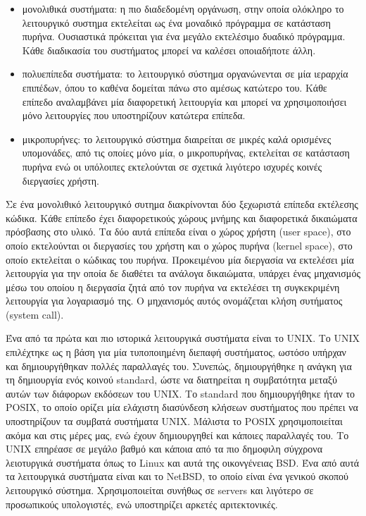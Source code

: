 \begin{itemize}
	\item μονολιθικά συστήματα: η πιο διαδεδομένη οργάνωση, στην οποία
		ολόκληρο το λειτουργικό συστημα εκτελείται ως ένα
		μοναδικό πρόγραμμα σε κατάσταση πυρήνα. Ουσιαστικά πρόκειται για
		ένα μεγάλο εκτελέσιμο δυαδικό πρόγραμμα. Κάθε διαδικασία του
		συστήματος μπορεί να καλέσει οποιαδήποτε άλλη. 
	\item πολυεπίπεδα συστήματα: το λειτουργικό σύστημα οργανώνενται σε μία
		ιεραρχία επιπέδων, όπου το καθένα δομείται πάνω στο αμέσως
		κατώτερο του. Κάθε επίπεδο αναλαμβάνει μία διαφορετική
		λειτουργία και μπορεί να χρησιμοποιήσει μόνο λειτουργίες που
		υποστηρίζουν κατώτερα επίπεδα.
	\item μικροπυρήνες: το λειτουργικό σύστημα διαιρείται σε μικρές καλά
		ορισμένες υπομονάδες, από τις οποίες μόνο μία, ο μικροπυρήνας,
		εκτελείται σε κατάσταση πυρήνα ενώ οι υπόλοιπες εκτελούνται σε
		σχετικά λιγότερο ισχυρές κοινές διεργασίες χρήστη.
\end{itemize}

Σε ένα μονολιθικό λειτουργικό συτημα διακρίνονται δύο ξεχωριστά επίπεδα
εκτέλεσης κώδικα. Κάθε επίπεδο έχει διαφορετικούς χώρους μνήμης και διαφορετικά
δικαιώματα πρόσβασης στο υλικό. Τα δύο αυτά επίπεδα είναι ο χώρος χρήστη
(user space), στο οποίο εκτελούνται οι διεργασίες του χρήστη και ο χώρος πυρήνα
(kernel space), στο οποίο εκτελείται ο κώδικας του πυρήνα. Προκειμένου μία
διεργασία να εκτελέσει μία λειτουργία για την οποία δε διαθέτει τα ανάλογα
δικαιώματα, υπάρχει ένας μηχανισμός μέσω του οποίου η διεργασία ζητά από τον
πυρήνα να εκτελέσει τη συγκεκριμένη λειτουργία για λογαριασμό της. Ο μηχανισμός
αυτός ονομάζεται κλήση συτήματος (system call). 


Ένα από τα πρώτα και πιο ιστορικά λειτουργικά συστήματα είναι το UNIX. Το UNIX
επιλέχτηκε ως η βάση για μία τυποποιημένη διεπαφή συστήματος, ωστόσο υπήρχαν και
δημιουργήθηκαν πολλές παραλλαγές του. Συνεπώς, δημιουργήθηκε η ανάγκη για τη
δημιουργία ενός κοινού standard, ώστε να διατηρείται η συμβατότητα μεταξύ αυτών
των διάφορων εκδόσεων του UNIX. Το standard που δημιουργήθηκε ήταν το POSIX, το
οποίο ορίζει μία ελάχιστη διασύνδεση κλήσεων συστήματος που πρέπει να
υποστηρίζουν τα συμβατά συστήματα UNIX. Μάλιστα το POSIX χρησιμοποιείται ακόμα
και στις μέρες μας, ενώ έχουν δημιουργηθεί και κάποιες παραλλαγές του. Το UNIX
επηρέασε σε μεγάλο βαθμό και κάποια από τα πιο δημοφιλη σύγχρονα λειοτυργικά
συστήματα όπως το Linux και αυτά της οικονγένειας BSD. Ένα από αυτά τα
λειτουργικά συστήματα είναι και το NetBSD, το οποίο είναι ένα γενικού σκοπού
λειτουργικό σύστημα. Χρησιμοποιείται συνήθως σε servers και λιγότερο σε
προσωπικούς υπολογιστές, ενώ υποστηρίζει αρκετές αριτεκτονικές. 


